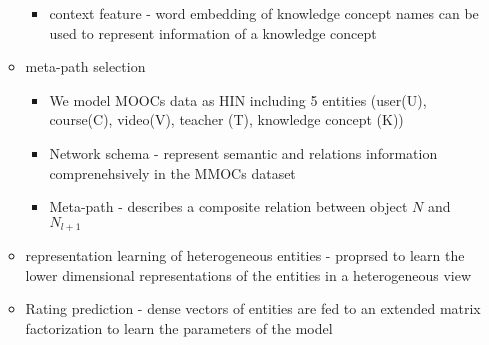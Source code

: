 \documentclass{report}
\begin{document}
\begin{itemize}
\begin{itemize}
\begin{itemize}
            \item context feature - word embedding of knowledge concept names can be used to represent information of a knowledge concept
        \end{itemize}
        \item meta-path selection
        \begin{itemize}
            \item We model MOOCs data as HIN including 5 entities (user(U), course(C), video(V), teacher (T), knowledge concept (K))
            \item Network schema - represent semantic and relations information comprenehsively in the MMOCs dataset
            \item Meta-path - describes a composite relation between object \(N\) and  \(N_{l+1}\)
        \end{itemize}
        \item representation learning of heterogeneous entities - proprsed to learn the lower dimensional representations of the entities in a heterogeneous view
        \item Rating prediction - dense vectors of entities are fed to an extended matrix factorization to learn the parameters of the model
    \end{itemize}
\end{itemize}
\end{document}
